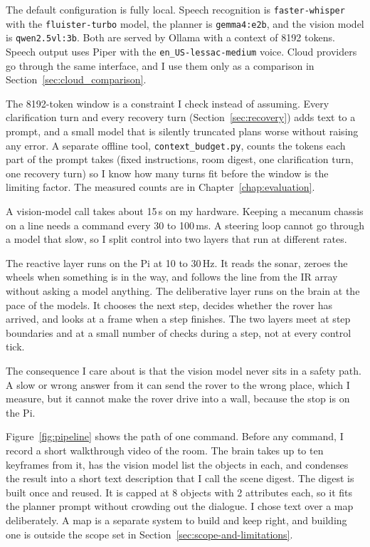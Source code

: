 The default configuration is fully local. Speech recognition is
\texttt{faster-whisper} with the \texttt{fluister-turbo} model, the planner is
\texttt{gemma4:e2b}, and the vision model is \texttt{qwen2.5vl:3b}. Both are
served by Ollama with a context of 8192 tokens. Speech output uses Piper with the
\texttt{en\_US-lessac-medium} voice. Cloud providers go through the same
interface, and I use them only as a comparison in
Section~\ref{sec:cloud_comparison}.

The 8192-token window is a constraint I check instead of assuming. Every
clarification turn and every recovery turn (Section~\ref{sec:recovery}) adds text
to a prompt, and a small model that is silently truncated plans worse without
raising any error. A separate offline tool, \texttt{context\_budget.py}, counts
the tokens each part of the prompt takes (fixed instructions, room digest, one
clarification turn, one recovery turn) so I know how many turns fit before the
window is the limiting factor. The measured counts are in
Chapter~\ref{chap:evaluation}.

\label{ssec:rates}

A vision-model call takes about 15\,s on my hardware. Keeping a mecanum chassis
on a line needs a command every 30 to 100\,ms. A steering loop cannot go through
a model that slow, so I split control into two layers that run at different rates.

The reactive layer runs on the Pi at 10 to 30\,Hz. It reads the sonar, zeroes the
wheels when something is in the way, and follows the line from the IR array
without asking a model anything. The deliberative layer runs on the brain at the
pace of the models. It chooses the next step, decides whether the rover has
arrived, and looks at a frame when a step finishes. The two layers meet at step
boundaries and at a small number of checks during a step, not at every control
tick.

The consequence I care about is that the vision model never sits in a safety
path. A slow or wrong answer from it can send the rover to the wrong place, which
I measure, but it cannot make the rover drive into a wall, because the stop is on
the Pi.

\label{ssec:pipeline}

Figure~\ref{fig:pipeline} shows the path of one command. Before any command, I
record a short walkthrough video of the room. The brain takes up to ten
keyframes from it, has the vision model list the objects in each, and condenses
the result into a short text description that I call the scene digest. The digest
is built once and reused. It is capped at 8 objects with 2 attributes each, so it
fits the planner prompt without crowding out the dialogue. I chose text over a
map deliberately. A map is a separate system to build and keep right, and
building one is outside the scope set in Section~\ref{sec:scope-and-limitations}.

